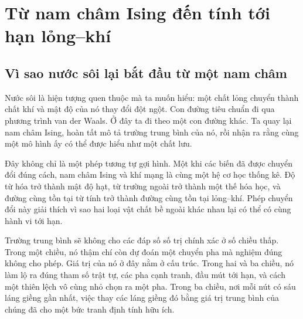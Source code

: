 \chapter{Từ nam châm Ising đến tính tới hạn lỏng--khí}


\section{Vì sao nước sôi lại bắt đầu từ một nam châm}

Nước sôi là hiện tượng quen thuộc mà ta muốn hiểu: một chất lỏng chuyển thành chất khí và mật độ của nó thay đổi đột ngột. Con đường tiêu chuẩn đi qua phương trình van der Waals. Ở đây ta đi theo một con đường khác. Ta quay lại nam châm Ising, hoàn tất mô tả trường trung bình của nó, rồi nhận ra rằng cùng một mô hình ấy có thể được hiểu như một chất lưu.

Đây không chỉ là một phép tương tự gợi hình. Một khi các biến đã được chuyển đổi đúng cách, nam châm Ising và khí mạng là cùng một hệ cơ học thống kê. Độ từ hóa trở thành mật độ hạt, từ trường ngoài trở thành một thế hóa học, và đường cùng tồn tại từ tính trở thành đường cùng tồn tại lỏng--khí. Phép chuyển đổi này giải thích vì sao hai loại vật chất bề ngoài khác nhau lại có thể có cùng hành vi tới hạn.

Trường trung bình sẽ không cho các đáp số số trị chính xác ở số chiều thấp. Trong một chiều, nó thậm chí còn dự đoán một chuyển pha mà nghiệm đúng không cho phép. Giá trị của nó ở đây nằm ở cấu trúc. Trong hai và ba chiều, nó làm lộ ra đúng tham số trật tự, các pha cạnh tranh, đầu mút tới hạn, và cách một thiên lệch vô cùng nhỏ chọn ra một pha. Trong ba chiều, nơi mỗi nút có sáu láng giềng gần nhất, việc thay các láng giềng đó bằng giá trị trung bình của chúng đã cho một bức tranh định tính hữu ích.

